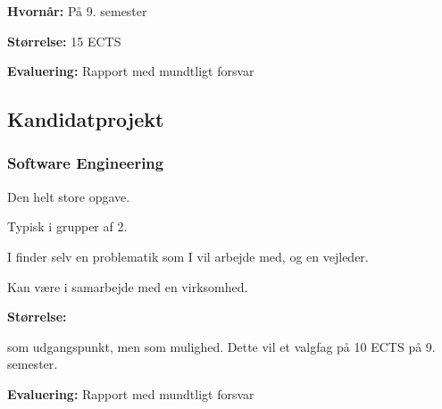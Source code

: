 {\begin{frame}[fragile]
  \vspace{5mm}
  \textbf{Hvornår:} På 9. semester
  
  \pause
  \vspace{5mm}
  \textbf{Størrelse:} 15 ECTS
  
  \pause
  \vspace{5mm}
  \textbf{Evaluering:} Rapport med mundtligt forsvar
\end{frame}

\subsection{Kandidatprojekt}
\begin{frame}[fragile]
  \frametitle{Software Engineering }
  \pause
  \vspace{3mm}
  Den helt store opgave.
  
  \vspace{5mm}
  Typisk i grupper af 2.
  
  \vspace{5mm}
  I finder selv en problematik som I vil arbejde med, og en vejleder.
  
  \vspace{5mm}
  Kan være i samarbejde med en virksomhed.
  
  \pause
  \vspace{5mm}
  \textbf{Størrelse:}
  \begin{itemize}
     som udgangspunkt\pause, men
     som mulighed. Dette vil  et valgfag på 10 ECTS på 9. semester.
  \end{itemize}
  
  \pause
  \vspace{5mm}
  \textbf{Evaluering:} Rapport med mundtligt forsvar
\end{frame}

}


